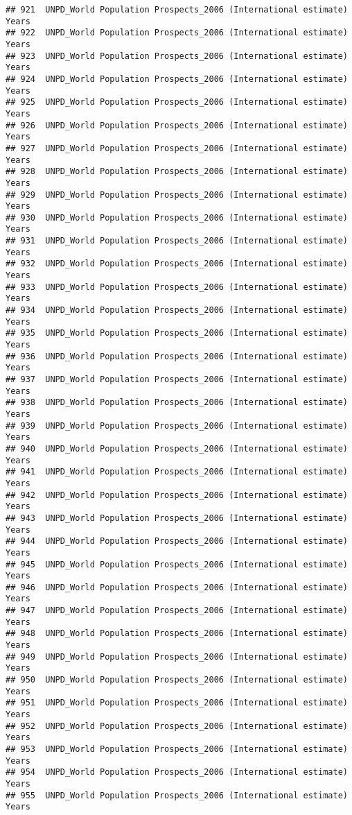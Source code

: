 \documentclass[]{article}
\begin{document}
\begin{verbatim}
## 921  UNPD_World Population Prospects_2006 (International estimate) Years
## 922  UNPD_World Population Prospects_2006 (International estimate) Years
## 923  UNPD_World Population Prospects_2006 (International estimate) Years
## 924  UNPD_World Population Prospects_2006 (International estimate) Years
## 925  UNPD_World Population Prospects_2006 (International estimate) Years
## 926  UNPD_World Population Prospects_2006 (International estimate) Years
## 927  UNPD_World Population Prospects_2006 (International estimate) Years
## 928  UNPD_World Population Prospects_2006 (International estimate) Years
## 929  UNPD_World Population Prospects_2006 (International estimate) Years
## 930  UNPD_World Population Prospects_2006 (International estimate) Years
## 931  UNPD_World Population Prospects_2006 (International estimate) Years
## 932  UNPD_World Population Prospects_2006 (International estimate) Years
## 933  UNPD_World Population Prospects_2006 (International estimate) Years
## 934  UNPD_World Population Prospects_2006 (International estimate) Years
## 935  UNPD_World Population Prospects_2006 (International estimate) Years
## 936  UNPD_World Population Prospects_2006 (International estimate) Years
## 937  UNPD_World Population Prospects_2006 (International estimate) Years
## 938  UNPD_World Population Prospects_2006 (International estimate) Years
## 939  UNPD_World Population Prospects_2006 (International estimate) Years
## 940  UNPD_World Population Prospects_2006 (International estimate) Years
## 941  UNPD_World Population Prospects_2006 (International estimate) Years
## 942  UNPD_World Population Prospects_2006 (International estimate) Years
## 943  UNPD_World Population Prospects_2006 (International estimate) Years
## 944  UNPD_World Population Prospects_2006 (International estimate) Years
## 945  UNPD_World Population Prospects_2006 (International estimate) Years
## 946  UNPD_World Population Prospects_2006 (International estimate) Years
## 947  UNPD_World Population Prospects_2006 (International estimate) Years
## 948  UNPD_World Population Prospects_2006 (International estimate) Years
## 949  UNPD_World Population Prospects_2006 (International estimate) Years
## 950  UNPD_World Population Prospects_2006 (International estimate) Years
## 951  UNPD_World Population Prospects_2006 (International estimate) Years
## 952  UNPD_World Population Prospects_2006 (International estimate) Years
## 953  UNPD_World Population Prospects_2006 (International estimate) Years
## 954  UNPD_World Population Prospects_2006 (International estimate) Years
## 955  UNPD_World Population Prospects_2006 (International estimate) Years

\end{verbatim}
\end{document}

